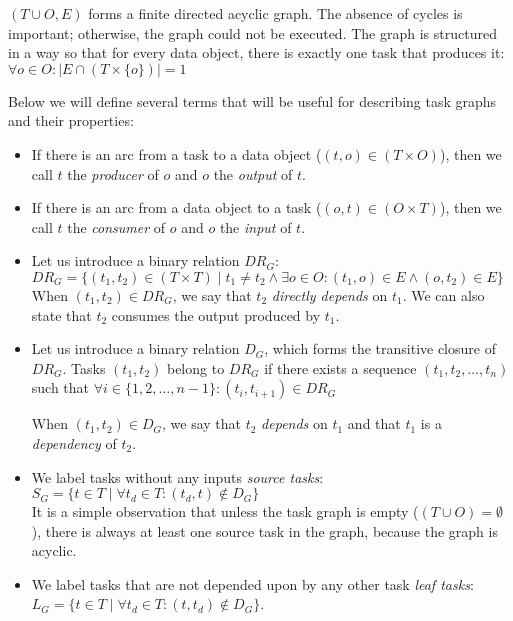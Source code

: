 $(T \cup O, E)$ forms a finite directed acyclic graph. The absence of cycles is important;
otherwise, the graph could not be executed. The graph is
structured in a way so that for every data object, there is exactly one task that produces it: \\
$\forall o \in O: |E \cap (T \times \{o\})| = 1$

\vspace{2mm}Below we will define several terms that will be useful for describing task
graphs and their properties:
\begin{itemize}
	\item If there is an arc from a task to a data object ($(t,o) \in (T\times{}O)$), then we call
	      $t$ the \emph{producer} of $o$ and
	      $o$ the \emph{output} of $t$.
	\item If there is an arc from a data object to a task ($(o,t) \in (O\times{}T)$), then we call
	      $t$ the \emph{consumer} of $o$ and
	      $o$ the \emph{input} of $t$.

	\item Let us introduce a binary relation $DR_G$: \\ $DR_G = \{(t_1, t_2)\in{}(T\times{}T) \mid t_1 \neq t_2 \land
		      \exists{}o\in{}O\colon (t_1, o)\in{}E
		      \land (o, t_2)\in{}E\}$ \\ When
	      $(t_1, t_2) \in DR_G$, we say that $t_2$ \emph{directly depends} on
	      $t_1$. We can also state that $t_2$ consumes the output produced
	      by $t_1$.

	\item Let us introduce a binary relation $D_G$, which forms the transitive closure of
	      $DR_G$. Tasks $(t_1, t_2)$ belong to $DR_G$ if there exists a sequence
		  $(t_1, t_2, \ldots, t_n)$ such that $\forall i \in \{1,2,\ldots,n - 1\}: (t_i, t_{i+1}) \in DR_G$

	      When $(t_1, t_2) \in D_G$, we say that $t_2$ \emph{depends} on $t_1$ and that
	      $t_1$ is a \emph{dependency} of $t_2$.

	\item We label tasks without any inputs \emph{source tasks}: \\ $S_G = \{ t\in{}T \mid
		      \forall{}t_d\in{}T\colon (t_d, t)\notin D_G\}$ \\ It is a
	      simple observation that unless the task graph is empty ($(T\cup{}O) = \emptyset$), there is always at
	      least one source task in the graph, because the graph is acyclic.
	\item We label tasks that are not depended upon by any other task \emph{leaf tasks}: \\
	      $L_G = \{ t\in{}T \mid \forall{}t_d\in{}T: (t,
		      t_d)\notin D_G\}$.
\end{itemize}

